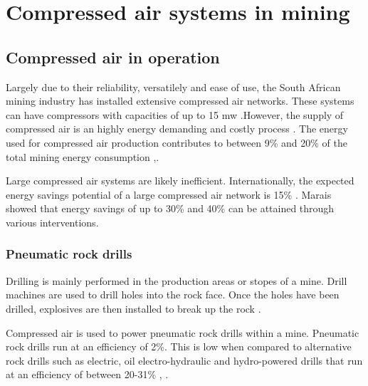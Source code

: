 \section{Compressed air systems in mining}
	\subsection{Compressed air in operation}\label{key}
		Largely due to their reliability, versatilely and ease of use, the South African mining industry has installed extensive compressed air networks. These systems can have compressors with capacities of up to 15 \gls{mw} \cite{Marais2012PhD}.However, the supply of compressed air is an highly energy demanding and costly process \cite{padachi2009energy}.  The energy used for compressed air production contributes to between 9\% and 20\% of the total mining energy consumption	\cite{Eskom2010Energy},\cite{du2011development}. 
		\par
		Large compressed air systems are likely inefficient. Internationally, the expected energy savings potential of a large compressed air network is 15\% \cite{neale2009compressed}. Marais \cite{marais2013simplification} showed that energy savings of up to 30\% and 40\% can be attained through various interventions. 
		\subsubsection{Pneumatic rock drills}
	 		Drilling is mainly performed in the production areas or stopes of a mine. Drill machines are used to drill holes into the rock face. Once the holes have been drilled, explosives are then installed to break up the rock \cite{van2008development}.
	 		\par
	  		Compressed air is used to power pneumatic rock drills within a mine. Pneumatic rock drills run at an efficiency of 2\%. This is low when compared to alternative rock drills such as electric, oil electro-hydraulic and hydro-powered drills that run at an efficiency of between 20-31\% \cite{fraser2008saving}, \cite{vanTonder2010Masters}. 
